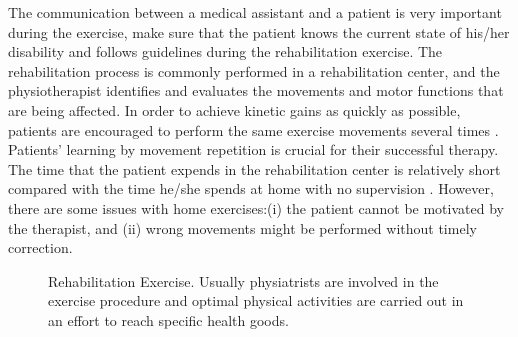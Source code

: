 The communication between a medical assistant and a patient is very important during the exercise, \eg make sure that the patient knows the current state of his/her disability and follows guidelines during the rehabilitation exercise. The rehabilitation process is commonly performed in a rehabilitation center, and the physiotherapist identifies and evaluates the movements and motor functions that are being affected. In order to achieve kinetic gains as quickly as possible, patients are encouraged to perform the same exercise movements several times \cite{Metcalf2013}. Patients' learning by movement repetition is crucial for their successful therapy. The time that the patient expends in the rehabilitation center is relatively short compared with the time he/she spends at home with no supervision \cite{Crocher2013}. However, there are some issues with home exercises:(i) the patient cannot be motivated by the therapist, and (ii) wrong movements might be performed without timely correction.

\begin{figure}
	\centering
	\qquad
	\caption{Rehabilitation Exercise. Usually physiatrists are involved in the exercise procedure and optimal physical activities are carried out in an effort to reach specific health goods.}
	\label{fig:2-bg:rehabilitation}
\end{figure}

